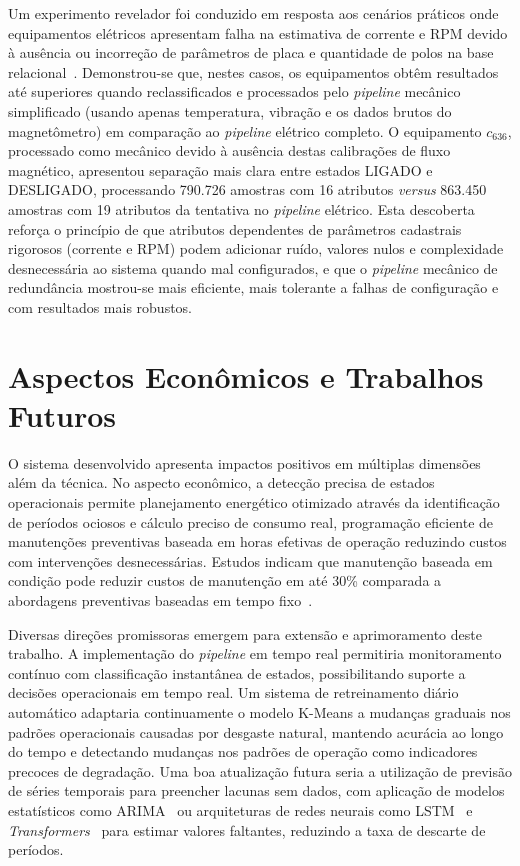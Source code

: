 Um experimento revelador foi conduzido em resposta aos cenários práticos onde equipamentos elétricos apresentam falha na estimativa de corrente e RPM devido à ausência ou incorreção de parâmetros de placa e quantidade de polos na base relacional~\cite{romary2022airgap, doe2014motor, garcia2025estimation}. Demonstrou-se que, nestes casos, os equipamentos obtêm resultados até superiores quando reclassificados e processados pelo \textit{pipeline} mecânico simplificado (usando apenas temperatura, vibração e os dados brutos do magnetômetro) em comparação ao \textit{pipeline} elétrico completo. O equipamento $c_{636}$, processado como mecânico devido à ausência destas calibrações de fluxo magnético, apresentou separação mais clara entre estados LIGADO e DESLIGADO, processando 790.726 amostras com 16 atributos \textit{versus} 863.450 amostras com 19 atributos da tentativa no \textit{pipeline} elétrico. Esta descoberta reforça o princípio de que atributos dependentes de parâmetros cadastrais rigorosos (corrente e RPM) podem adicionar ruído, valores nulos e complexidade desnecessária ao sistema quando mal configurados, e que o \textit{pipeline} mecânico de redundância mostrou-se mais eficiente, mais tolerante a falhas de configuração e com resultados mais robustos.

\section{Aspectos Econômicos e Trabalhos Futuros}

O sistema desenvolvido apresenta impactos positivos em múltiplas dimensões além da técnica. No aspecto econômico, a detecção precisa de estados operacionais permite planejamento energético otimizado através da identificação de períodos ociosos e cálculo preciso de consumo real, programação eficiente de manutenções preventivas baseada em horas efetivas de operação reduzindo custos com intervenções desnecessárias. Estudos indicam que manutenção baseada em condição pode reduzir custos de manutenção em até 30\% comparada a abordagens preventivas baseadas em tempo fixo~\cite{jardine2006review}.

Diversas direções promissoras emergem para extensão e aprimoramento deste trabalho. A implementação do \textit{pipeline} em tempo real permitiria monitoramento contínuo com classificação instantânea de estados, possibilitando suporte a decisões operacionais em tempo real. Um sistema de retreinamento diário automático adaptaria continuamente o modelo K-Means a mudanças graduais nos padrões operacionais causadas por desgaste natural, mantendo acurácia ao longo do tempo e detectando mudanças nos padrões de operação como indicadores precoces de degradação. Uma boa atualização futura seria a utilização de previsão de séries temporais para preencher lacunas sem dados, com aplicação de modelos estatísticos como ARIMA~\cite{box1970arima} ou arquiteturas de redes neurais como LSTM~\cite{hochreiter1997lstm} e \textit{Transformers}~\cite{vaswani2017attention} para estimar valores faltantes, reduzindo a taxa de descarte de períodos.


